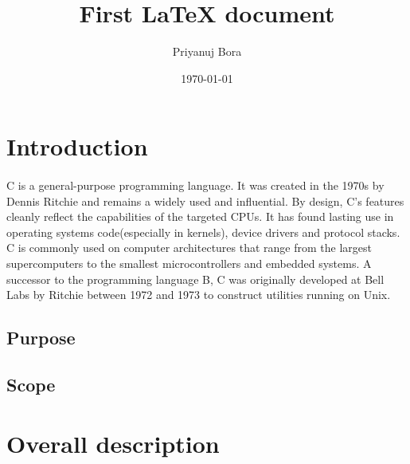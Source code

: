 \documentclass{article}
\title{First LaTeX document}
\author{Priyanuj Bora}
\date{\today}
\begin{document}
	\maketitle %
	
	\tableofcontents
	
	\section{Introduction}
	\paragraph{}
	C is a general-purpose programming language. It was created in the 1970s by Dennis Ritchie and remains a widely used and influential. By design, C's features cleanly reflect the capabilities of the targeted CPUs. It has found lasting use in operating systems code(especially in kernels), device drivers and protocol stacks. C is commonly used on computer architectures that range from the largest supercomputers to the smallest microcontrollers and embedded systems. A successor to the programming language B, C was originally developed at Bell Labs by Ritchie between 1972 and 1973 to construct utilities running on Unix.
	
	\subsection{Purpose}
	
	\subsection{Scope}
	
	\section{Overall description}
\end{document}
